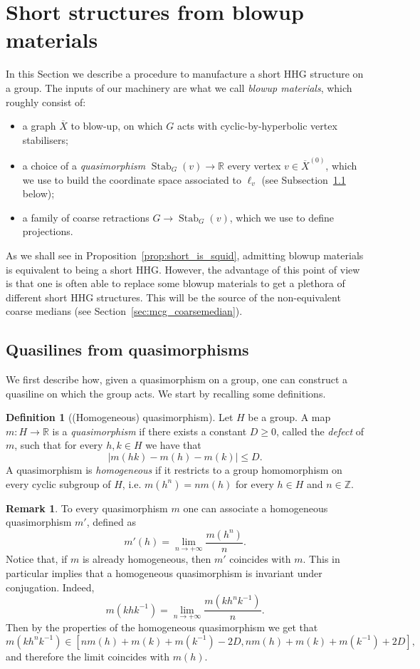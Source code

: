 \documentclass[svgnames]{amsart}
\theoremstyle{plain}
\theoremstyle{definition}
\newtheorem{defn}[thm]{Definition}
\newtheorem{rem}[thm]{Remark}
\newcommand{\R}{\mathbb{R}}
\newcommand{\ov}[1]{\overline{#1}}
\newcommand{\Stab}[2]{\operatorname{Stab}_{#1}(#2)}
\begin{document}
\section{Short structures from blowup materials}\label{sec:squid}
In this Section we describe a procedure to manufacture a short HHG structure on a group. The inputs of our machinery are what we call \emph{blowup materials}, which roughly consist of:
\begin{itemize}
    \item a graph $\ov X$ to blow-up, on which $G$ acts with cyclic-by-hyperbolic vertex stabilisers;
    \item a choice of a \emph{quasimorphism} $\Stab{G}{v}\to \R$ every vertex $v\in \ov X^{(0)}$, which we use to build the coordinate space associated to $\ell_v$ (see Subsection~\ref{subsec:quasilines_from_quasimorph} below);
    \item a family of coarse retractions $G\to \Stab{G}{v}$, which we use to define projections.
\end{itemize}  
As we shall see in Proposition~\ref{prop:short_is_squid}, admitting blowup materials is equivalent to being a short HHG. However, the advantage of this point of view is that one is often able to replace some blowup materials to get a plethora of different short HHG structures. This will be the source of the non-equivalent coarse medians (see Section~\ref{sec:mcg_coarsemedian}).

\subsection{Quasilines from quasimorphisms}\label{subsec:quasilines_from_quasimorph}
We first describe how, given a quasimorphism on a group, one can construct a quasiline on which the group acts. We start by recalling some definitions.
\begin{defn}[(Homogeneous) quasimorphism]
    Let $H$ be a group. A map $m\colon H\to \mathbb{R}$ is a \emph{quasimorphism} if there exists a constant $D\ge 0$, called the \emph{defect} of $m$, such that for every $h,k\in H$ we have that
    $$|m(hk)-m(h)-m(k)|\le D.$$
    A quasimorphism is \emph{homogeneous} if it restricts to a group homomorphism on every cyclic subgroup of $H$, i.e. $m(h^n)=nm(h)$ for every $h\in H$ and $n\in\mathbb{Z}$. 
\end{defn}

\begin{rem}\label{rem:plasmon}
To every quasimorphism $m$ one can associate a homogeneous quasimorphism $m'$, defined as
$$m'(h)=\lim_{n\to+\infty} \frac{m(h^n)}{n}.$$
Notice that, if $m$ is already homogeneous, then $m'$ coincides with $m$. This in particular implies that a homogeneous quasimorphism is invariant under conjugation. Indeed,
$$m(khk^{-1})=\lim_{n\to+\infty} \frac{m(kh^nk^{-1})}{n}.$$
Then by the properties of the homogeneous quasimorphism we get that
$$m(kh^nk^{-1})\in \left[n m(h)+m(k)+m(k^{-1})-2D, nm(h)+m(k)+m(k^{-1})+2D\right],$$ 
and therefore the limit coincides with $m(h)$.
\end{rem}
\end{document}
